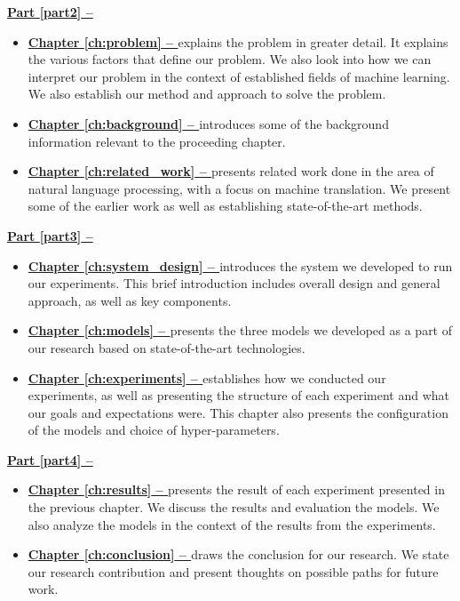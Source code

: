 \noindent
\textbf{{\hyperref[part2]{Part \ref{part2} -- }}}
\begin{itemize}
    \item\textbf{\hyperref[ch:problem]{Chapter \ref{ch:problem} -- }} explains the problem in greater detail. It explains the various factors that define our problem. We also look into how we can interpret our problem in the context of established fields of machine learning. We also establish our method and approach to solve the problem.
    \item\textbf{\hyperref[ch:background]{Chapter \ref{ch:background} -- }} introduces some of the background information relevant to the proceeding chapter.
    \item\textbf{\hyperref[ch:related_work]{Chapter \ref{ch:related_work} -- }} presents related work done in the area of natural language processing, with a focus on machine translation. We present some of the earlier work as well as establishing state-of-the-art methods.
\end{itemize}

\noindent
\textbf{{\hyperref[part3]{Part \ref{part3} -- }}}
\begin{itemize}
    \item\textbf{\hyperref[ch:system_design]{Chapter \ref{ch:system_design} -- }} introduces the system we developed to run our experiments. This brief introduction includes overall design and general approach, as well as key components.
    \item\textbf{\hyperref[ch:models]{Chapter \ref{ch:models} -- }} presents the three models we developed as a part of our research based on state-of-the-art technologies.
    \item\textbf{\hyperref[ch:experiments]{Chapter \ref{ch:experiments} -- }} establishes how we conducted our experiments, as well as presenting the structure of each experiment and what our goals and expectations were. This chapter also presents the configuration of the models and choice of hyper-parameters.
\end{itemize}

\noindent
\textbf{{\hyperref[part4]{Part \ref{part4} -- }}}
\begin{itemize}
    \item\textbf{\hyperref[ch:results]{Chapter \ref{ch:results} -- }} presents the result of each experiment presented in the previous chapter. We discuss the results and evaluation the models. We also analyze the models in the context of the results from the experiments.
    \item\textbf{\hyperref[ch:conclusion]{Chapter \ref{ch:conclusion} -- }} draws the conclusion for our research. We state our research contribution and present thoughts on possible paths for future work.
\end{itemize}